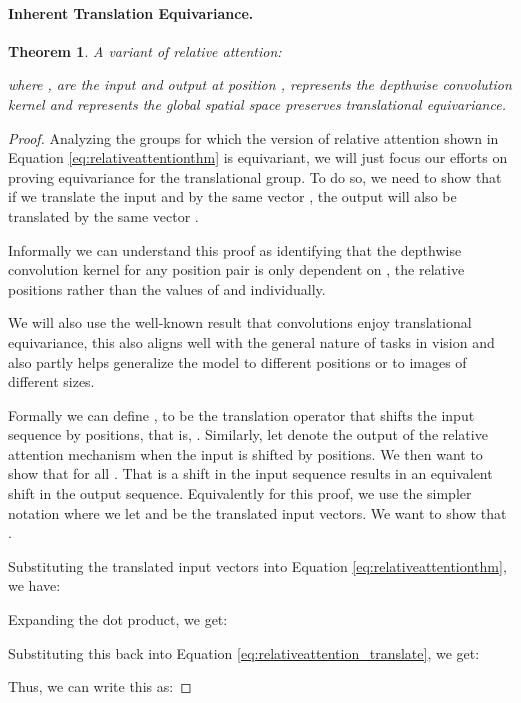 \documentclass{article} \usepackage{iclr2023_conference,times}
\newtheorem{theorem}{Theorem}
\begin{document}
\paragraph{Inherent Translation Equivariance.}
\begin{theorem}
A variant of relative attention:

where ,  are the input and output at position ,  represents the depthwise convolution kernel and  represents the global spatial space preserves translational equivariance.
\end{theorem}
\begin{proof}
Analyzing the groups for which the version of relative attention shown in Equation \ref{eq:relativeattentionthm} is equivariant, we will just focus our efforts on proving equivariance for the translational group. To do so, we need to show that if we translate the input  and  by the same vector , the output  will also be translated by the same vector .

Informally we can understand this proof as identifying that the depthwise convolution kernel for any position pair  is only dependent on , the relative positions rather than the values of  and  individually.

We will also use the well-known result that convolutions enjoy translational equivariance, this also aligns well with the general nature of tasks in vision and also partly helps generalize the model to different positions or to images of different sizes.

Formally we can define , to be the translation operator that shifts the input sequence  by  positions, that is, . Similarly, let  denote the output of the relative attention mechanism when the input is shifted by  positions. We then want to show that  for all . That is a shift in the input sequence results in an equivalent shift in the output sequence. Equivalently for this proof, we use the simpler notation where we let  and  be the translated input vectors. We want to show that .

Substituting the translated input vectors into Equation \ref{eq:relativeattentionthm}, we have:



Expanding the dot product, we get:



Substituting this back into Equation \ref{eq:relativeattention_translate}, we get:



Thus, we can write this as:




\end{proof}
\end{document}
